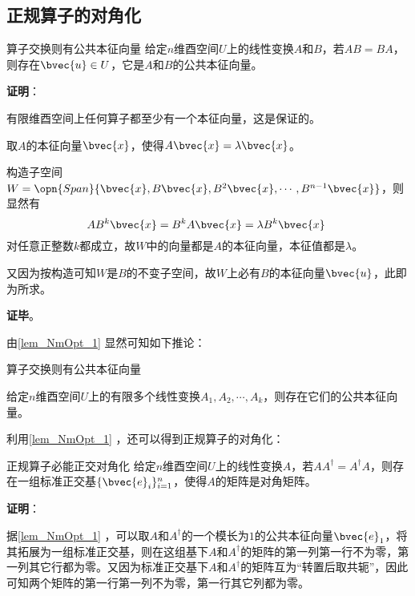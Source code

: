 \subsection{正规算子的对角化}

\begin{lemma}{算子交换则有公共本征向量}\label{lem_NmOpt_1}
给定$n$维酉空间$U$上的线性变换$A$和$B$，若$AB=BA$，则存在$\bvec{u}\in U$，它是$A$和$B$的公共本征向量。
\end{lemma}


\textbf{证明}：

有限维酉空间上任何算子都至少有一个本征向量，这是保证的。

取$A$的本征向量$\bvec{x}$，使得$A\bvec{x}=\lambda\bvec{x}$。

构造子空间$W=\opn{Span}\{\bvec{x}, B\bvec{x}, B^2\bvec{x}, \cdots, B^{n-1}\bvec{x}\}$，则显然有
\begin{equation}
AB^k\bvec{x} = B^kA\bvec{x} = \lambda B^k\bvec{x}~
\end{equation}
对任意正整数$k$都成立，故$W$中的向量都是$A$的本征向量，本征值都是$\lambda$。

又因为按构造可知$W$是$B$的不变子空间，故$W$上必有$B$的本征向量$\bvec{u}$，此即为所求。

\textbf{证毕}。



由\autoref{lem_NmOpt_1} 显然可知如下推论：

\begin{corollary}{算子交换则有公共本征向量}\label{cor_NmOpt_1}

给定$n$维酉空间$U$上的有限多个线性变换$A_1, A_2, \cdots, A_k$，则存在它们的公共本征向量。

\end{corollary}



利用\autoref{lem_NmOpt_1} ，还可以得到正规算子的对角化：


\begin{theorem}{正规算子必能正交对角化}\label{the_NmOpt_1}
给定$n$维酉空间$U$上的线性变换$A$，若$AA^\dagger = A^\dagger A$，则存在一组标准正交基$\{\bvec{e}_i\}_{i=1}^n$，使得$A$的矩阵是对角矩阵。
\end{theorem}

\textbf{证明}：

据\autoref{lem_NmOpt_1} ，可以取$A$和$A^\dagger$的一个模长为$1$的公共本征向量$\bvec{e}_1$，将其拓展为一组标准正交基，则在这组基下$A$和$A^\dagger$的矩阵的第一列第一行不为零，第一列其它行都为零。又因为标准正交基下$A$和$A^\dagger$的矩阵互为“转置后取共轭”，因此可知两个矩阵的第一行第一列不为零，第一行其它列都为零。

